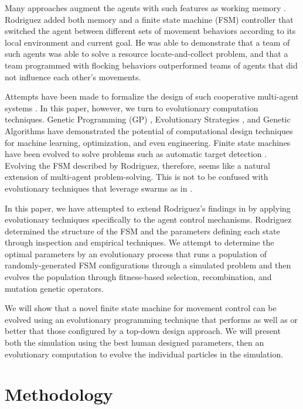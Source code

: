 \documentclass[12pt,journal,compsoc]{IEEEtran}
\begin{document}
Many approaches augment the agents with such features as working memory \cite{winder2012role,hu2003particle}. Rodriguez \cite{rodriguez2004extending} added both memory and a finite state machine (FSM) controller that switched the agent between different sets of movement behaviors according to its local environment and current goal. He was able to demonstrate that a team of such agents was able to solve a resource locate-and-collect problem, and that a team programmed with flocking behaviors outperformed teams of agents that did not influence each other's movements.

Attempts have been made to formalize the design of such cooperative multi-agent systems \cite{mataric1993designing,capera2003amas}. In this paper, however, we turn to evolutionary computation techniques. Genetic Programming (GP) \cite{koza1992genetic}, Evolutionary Strategies \cite{rechenberg1989evolution}, and Genetic Algorithms \cite{goldberg1988genetic} have demonstrated the potential of computational design techniques for machine learning, optimization, and even engineering. Finite state machines have been evolved to solve problems such as automatic target detection \cite{benson2000evolving}. Evolving the FSM described by Rodriguez, therefore, seems like a natural extension of multi-agent problem-solving. This is not to be confused with evolutionary techniques that leverage swarms as in \cite{wei2002swarm,miranda2005evolutionary}.

In this paper, we have attempted to extend Rodriguez's findings in \cite{rodriguez2004extending} by applying evolutionary techniques specifically to the agent control mechanisms. Rodriguez determined the structure of the FSM and the parameters defining each state through inspection and empirical techniques. We attempt to determine the optimal parameters by an evolutionary process that runs a population of randomly-generated FSM configurations through a simulated problem and then evolves the population through fitness-based selection, recombination, and mutation genetic operators.

We will show that a novel finite state machine for movement control can be evolved using an evolutionary programming technique that performs as well as or better that those configured by a top-down design approach. We will present both the simulation using the best human designed parameters, then an evolutionary computation to evolve the individual particles in the simulation.

\section{Methodology}
\end{document}
